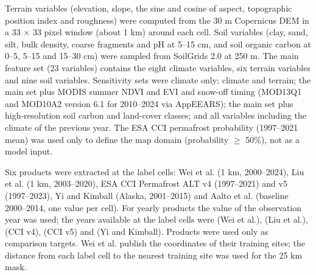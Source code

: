 Terrain variables (elevation, slope, the sine and cosine of aspect, topographic position index and roughness) were computed from the 30 m Copernicus DEM\cite{CopDEM2021} in a 33 $\times$ 33 pixel window (about 1 km) around each cell. Soil variables (clay, sand, silt, bulk density, coarse fragments and pH at 5--15 cm, and soil organic carbon at 0--5, 5--15 and 15--30 cm) were sampled from SoilGrids 2.0 at 250 m\cite{Poggio2021}. The main feature set (23 variables) contains the eight climate variables, six terrain variables and nine soil variables. Sensitivity sets were climate only; climate and terrain; the main set plus MODIS summer NDVI and EVI and snow-off timing (MOD13Q1 and MOD10A2 version 6.1 for 2010--2024 via AppEEARS\cite{Didan2021,HallRiggs2021}); the main set plus high-resolution soil carbon and land-cover classes\cite{Palmtag2022}; and all variables including the climate of the previous year. The ESA CCI permafrost probability (1997--2021 mean)\cite{Westermann2024} was used only to define the map domain (probability $\geq$ 50\%), not as a model input.

Six products were extracted at the label cells: Wei et al.\cite{Wei2026} (1 km, 2000--2024), Liu et al.\cite{Liu2024} (1 km, 2003--2020), ESA CCI Permafrost ALT v4 (1997--2021) and v5 (1997--2023)\cite{Westermann2024,Westermann2025}, Yi and Kimball\cite{YiKimball2019} (Alaska, 2001--2015) and Aalto et al.\cite{Aalto2018} (baseline 2000--2014, one value per cell). For yearly products the value of the observation year was used; the years available at the label cells were \nyrsprodWei{} (Wei et al.), \nyrsprodLiu{} (Liu et al.), \nyrsprodCcifour{} (CCI v4), \nyrsprodCcifive{} (CCI v5) and \nyrsprodYk{} (Yi and Kimball). Products were used only as comparison targets. Wei et al. publish the coordinates of their training sites; the distance from each label cell to the nearest training site was used for the 25 km mask.

